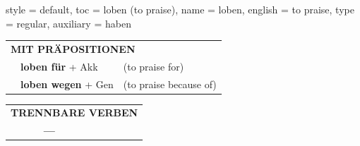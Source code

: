 \begin{verbentry}{
  style = {default},
  toc = {loben (to praise)},
  name = {loben},
  english = {to praise},
  type = {regular},
  auxiliary = {haben}
}
   \vspace{10pt}

   \begin{tabular}{lll}
      \multicolumn{3}{l}{\textbf{MIT PRÄPOSITIONEN}}\\
& \textbf{loben für} + Akk & (to praise for)\\
& \textbf{loben wegen} + Gen & (to praise because of)\\
\end{tabular}
  \hfill
   \begin{tabular}{lll}
\multicolumn{3}{l}{\textbf{TRENNBARE VERBEN}}\\
& \textbf{---} & \\
\end{tabular}

  \vspace{-5pt}
\end{verbentry}
